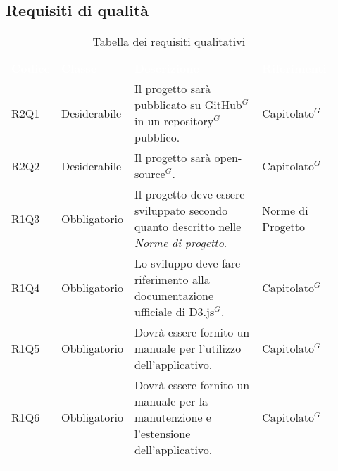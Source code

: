\subsection{Requisiti di qualità}
{\renewcommand{\arraystretch}{1.5}
\begin{longtable}{p{0.12\linewidth}p{0.15\linewidth}p{0.50\linewidth}p{0.15\linewidth}}
	\rowcolor[RGB]{33, 73, 50}
	\textcolor{white}{\textbf{Codice}} & \textcolor{white}{\textbf{Classe}} & \textcolor{white}{\textbf{Descrizione}} &
    \textcolor{white}{\textbf{Riferimenti}}\\

    \rowcolor[RGB]{216, 235, 171}
    R2Q1 & Desiderabile & Il progetto sarà pubblicato su GitHub$^{G}$ in un repository$^{G}$ pubblico. & Capitolato$^{G}$\\
    \rowcolor[RGB]{233, 245, 206}
    R2Q2 & Desiderabile & Il progetto sarà open-source$^{G}$. & Capitolato$^{G}$\\
    \rowcolor[RGB]{216, 235, 171}
    R1Q3 & Obbligatorio & Il progetto deve essere sviluppato secondo quanto descritto nelle \textit{Norme di progetto}. & Norme di Progetto\\
    \rowcolor[RGB]{233, 245, 206}
    R1Q4 & Obbligatorio & Lo sviluppo deve fare riferimento alla documentazione ufficiale di D3.js$^{G}$. & Capitolato$^{G}$\\
    \rowcolor[RGB]{216, 235, 171}
    R1Q5 & Obbligatorio & Dovrà essere fornito un manuale per l'utilizzo dell'applicativo. & Capitolato$^{G}$\\
    \rowcolor[RGB]{233, 245, 206}
    R1Q6 & Obbligatorio & Dovrà essere fornito un manuale per la manutenzione e l'estensione dell'applicativo. & Capitolato$^{G}$\\

    \caption{Tabella dei requisiti qualitativi}
\end{longtable}
}


